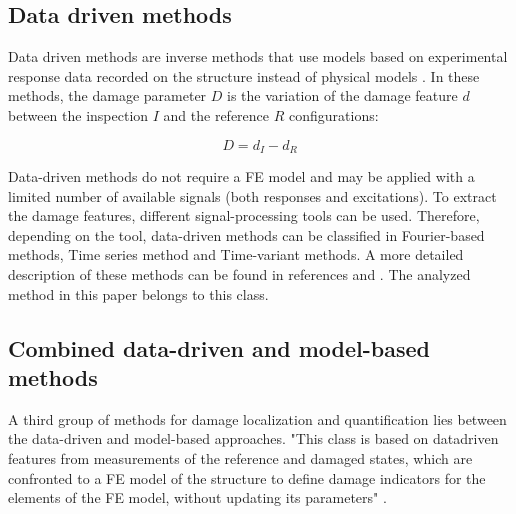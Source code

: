 \documentclass[journal]{IEEEtran}
\begin{document}
\subsection{Data driven methods}

Data driven methods are inverse methods that use models based on experimental response data recorded on the structure instead of physical models
\cite{limongelli2016towards}.
 In these methods, the damage parameter $D$ is the variation of the damage feature $d$ between the inspection $I$ and the reference $R$ configurations: %


\begin{equation}
D=d_{I} - d_{R}
\end{equation}

Data-driven methods do not require a FE model  and may be applied with a limited number of available signals (both responses and excitations).
To extract the damage features, different signal-processing tools can be used. Therefore, depending on the tool,  data-driven methods can be classified in Fourier-based methods, Time series method and Time-variant methods.
A more detailed description of these methods can be found in references %
\cite{fassois2007time} and
\cite{staszewski2007time}.
The analyzed method in this paper belongs to this class.

\subsection{Combined data-driven and model-based methods}

A third group of methods for damage localization and quantification lies between the data-driven and model-based approaches.
 "This class is based on datadriven features from measurements of the reference and damaged states, which are confronted to a FE model of the structure to define damage indicators for the elements of the FE model,
 without updating its parameters" \cite{limongelli2016towards}. %
\end{document}

